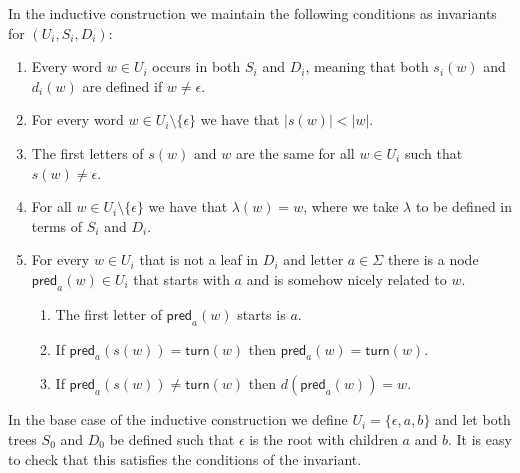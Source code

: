 \documentclass[a4paper]{article}
\begin{document}
\newcommand{\pred}{\mathsf{pred}}

In the inductive construction we maintain the following conditions as
invariants for $(U_i,S_i,D_i)$:
\begin{enumerate}
 \item Every word $w \in U_i$ occurs in both $S_i$ and $D_i$, meaning
that both $s_i(w)$ and $d_i(w)$ are defined if $w \neq \epsilon$.
 \item For every word $w \in U_i \setminus \{\epsilon\}$ we have that
$|s(w)| < |w|$.
 \item The first letters of $s(w)$ and $w$ are the same for all $w \in
U_i$ such that $s(w) \neq \epsilon$.
 \item For all $w \in U_i \setminus \{\epsilon\}$ we have that
$\lambda(w) = w$, where we take $\lambda$ to be defined in terms of
$S_i$ and $D_i$.
 \item For every $w \in U_i$ that is not a leaf in $D_i$ and letter $a
\in \Sigma$ there is a node $\pred_a(w) \in U_i$ that starts
with $a$ and is somehow nicely related to $w$.
\begin{enumerate}
 \item The first letter of $\pred_a(w)$ starts is $a$.
 \item If $\pred_a(s(w)) = \mathsf{turn}(w)$ then $\pred_a(w) =
\mathsf{turn}(w)$.
 \item If $\pred_a(s(w)) \neq \mathsf{turn}(w)$ then $d(\pred_a(w)) = w$.
\end{enumerate}
\end{enumerate}

In the base case of the inductive construction we define $U_i =
\{\epsilon, a, b\}$ and let both trees $S_0$ and $D_0$ be defined such
that $\epsilon$ is the root with children $a$ and $b$. It is easy to
check that this satisfies the conditions of the invariant.
\end{document}
